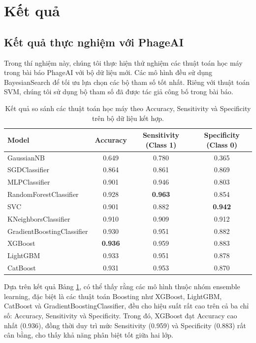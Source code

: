 \section{Kết quả}
\subsection{Kết quả thực nghiệm với PhageAI}
Trong thí nghiệm này, chúng tôi thực hiện thử nghiệm các thuật toán học máy trong bài báo PhageAI với bộ dữ liệu mới. Các mô hình đều sử dụng BayesianSearch để tối ưu lựa chọn các bộ tham số tốt nhất. Riêng với thuật toán SVM, chúng tôi sử dụng bộ tham số đã được tác giả công bố trong bài báo.
\begin{table}[ht]
\footnotesize
\centering
\begin{tabular}{|l|c|c|c|}
\hline
\textbf{Model} & \textbf{Accuracy} & \textbf{Sensitivity (Class 1)} & \textbf{Specificity (Class 0)} \\
\hline
GaussianNB & 0.649 & 0.780 & 0.365 \\
SGDClassifier & 0.864 & 0.861 & 0.869 \\
MLPClassifier & 0.901 & 0.946 & 0.803 \\
RandomForestClassifier & 0.928 & \textbf{0.963} & 0.854 \\
SVC & 0.901 & 0.882 & \textbf{0.942} \\
KNeighborsClassifier & 0.910 & 0.909 & 0.912 \\
GradientBoostingClassifier & 0.930 & 0.951 & 0.882 \\
XGBoost & \textbf{0.936} & 0.959 & 0.883 \\
LightGBM & 0.933 & 0.951 & 0.878 \\
CatBoost & 0.931 & 0.953 & 0.870 \\
\hline
\end{tabular}
\caption{Kết quả so sánh các thuật toán học máy theo Accuracy, Sensitivity và Specificity trên bộ dữ liệu kết hợp.}
\label{tab:model_comparison}
\end{table}

Dựa trên kết quả Bảng \ref{tab:model_comparison}, có thể thấy rằng các mô hình thuộc nhóm ensemble learning, đặc biệt là các thuật toán Boosting như XGBoost, LightGBM, CatBoost và GradientBoostingClassifier, đều cho hiệu suất rất cao trên cả ba chỉ số: Accuracy, Sensitivity và Specificity. Trong đó, XGBoost đạt Accuracy cao nhất (0.936), đồng thời duy trì mức Sensitivity (0.959) và Specificity (0.883) rất cân bằng, cho thấy khả năng phân biệt tốt giữa hai lớp.

